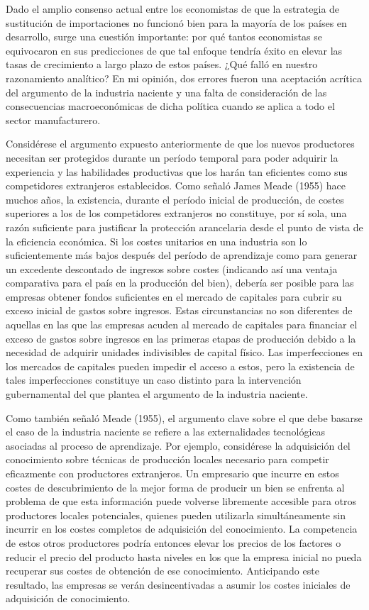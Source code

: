 \documentclass[10pt,a4paper]{article}
\begin{document}
Dado el amplio consenso actual entre los economistas de que la estrategia de sustitución de importaciones no funcionó bien para la mayoría de los países en desarrollo, surge una cuestión importante: por qué tantos economistas se equivocaron en sus predicciones de que tal enfoque tendría éxito en elevar las tasas de crecimiento a largo plazo de estos países. ¿Qué falló en nuestro razonamiento analítico? En mi opinión, dos errores fueron una aceptación acrítica del argumento de la industria naciente y una falta de consideración de las consecuencias macroeconómicas de dicha política cuando se aplica a todo el sector manufacturero.

Considérese el argumento expuesto anteriormente de que los nuevos productores necesitan ser protegidos durante un período temporal para poder adquirir la experiencia y las habilidades productivas que los harán tan eficientes como sus competidores extranjeros establecidos. Como señaló James Meade (1955) hace muchos años, la existencia, durante el período inicial de producción, de costes superiores a los de los competidores extranjeros no constituye, por sí sola, una razón suficiente para justificar la protección arancelaria desde el punto de vista de la eficiencia económica. Si los costes unitarios en una industria son lo suficientemente más bajos después del período de aprendizaje como para generar un excedente descontado de ingresos sobre costes (indicando así una ventaja comparativa para el país en la producción del bien), debería ser posible para las empresas obtener fondos suficientes en el mercado de capitales para cubrir su exceso inicial de gastos sobre ingresos. Estas circunstancias no son diferentes de aquellas en las que las empresas acuden al mercado de capitales para financiar el exceso de gastos sobre ingresos en las primeras etapas de producción debido a la necesidad de adquirir unidades indivisibles de capital físico. Las imperfecciones en los mercados de capitales pueden impedir el acceso a estos, pero la existencia de tales imperfecciones constituye un caso distinto para la intervención gubernamental del que plantea el argumento de la industria naciente.

Como también señaló Meade (1955), el argumento clave sobre el que debe basarse el caso de la industria naciente se refiere a las externalidades tecnológicas asociadas al proceso de aprendizaje. Por ejemplo, considérese la adquisición del conocimiento sobre técnicas de producción locales necesario para competir eficazmente con productores extranjeros. Un empresario que incurre en estos costes de descubrimiento de la mejor forma de producir un bien se enfrenta al problema de que esta información puede volverse libremente accesible para otros productores locales potenciales, quienes pueden utilizarla simultáneamente sin incurrir en los costes completos de adquisición del conocimiento. La competencia de estos otros productores podría entonces elevar los precios de los factores o reducir el precio del producto hasta niveles en los que la empresa inicial no pueda recuperar sus costes de obtención de ese conocimiento. Anticipando este resultado, las empresas se verán desincentivadas a asumir los costes iniciales de adquisición de conocimiento.
\end{document}
